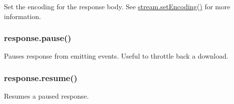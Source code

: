 Set the encoding for the response body. See
\href{stream.html\#stream\_stream\_setencoding\_encoding}{stream.setEncoding()}
for more information.

\subsubsection{response.pause()}

Pauses response from emitting events. Useful to throttle back a
download.

\subsubsection{response.resume()}

Resumes a paused response.
